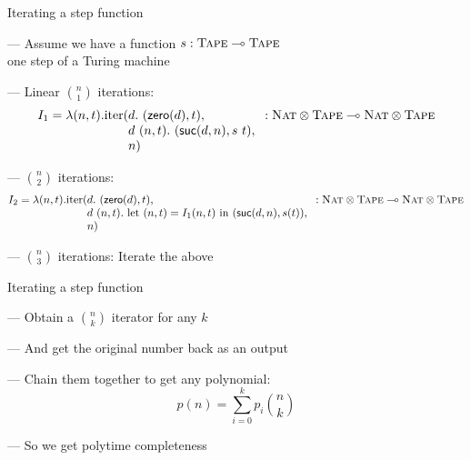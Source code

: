 \documentclass[xetex,serif,mathserif,aspectratio=169]{beamer}
\newcommand{\youtem}{\quad \textcolor{titlered!80}{---} \quad}
\newcommand{\HEAD}[1]{\textcolor{titlered}{#1}}
\begin{document}
\begin{frame}
  \HEAD{Iterating a step function}

  \bigskip

  \youtem Assume we have a function $s : \textsc{Tape} \multimap \textsc{Tape}$\\
  \hspace{2cm} \textcolor{black!60}{one step of a Turing machine}

  \medskip

  \youtem Linear $n \choose 1$ iterations:
  \begin{displaymath}
    I_1 = \lambda (n,t). \mathrm{iter}(
    \begin{array}[t]{@{}l}
      d.~(\mathsf{zero}(d),t), \\
      d~(n,t).~(\mathsf{suc}(d,n),s~t),\\
      n)
    \end{array}
    : \TyNat \otimes \textsc{Tape} \multimap \TyNat \otimes \textsc{Tape}
  \end{displaymath}

  \medskip

  \youtem $n \choose 2$ iterations:
  \begin{displaymath}
    I_2 = \lambda(n,t).\mathrm{iter}(
    \begin{array}[t]{@{}l}
      d.~(\mathsf{zero}(d),t),\\
      d~(n,t).~\mathrm{let}~(n,t) = I_1(n,t)~\mathrm{in}~(\mathsf{suc}(d,n),s(t)),\\
      n)
    \end{array}
    : \TyNat \otimes \textsc{Tape} \multimap \TyNat \otimes \textsc{Tape}
  \end{displaymath}

  \medskip

  \youtem $n \choose 3$ iterations: Iterate the above
\end{frame}

\begin{frame}
  \HEAD{Iterating a step function}

  \bigskip

  \youtem Obtain a $n \choose k$ iterator for any $k$

  \medskip

  \youtem And get the original number back as an output

  \medskip

  \youtem Chain them together to get any polynomial:
  \begin{displaymath}
    p(n) = \sum_{i=0}^k p_i{n \choose k}
  \end{displaymath}

  \medskip

  \youtem So we get polytime completeness
\end{frame}
\end{document}
